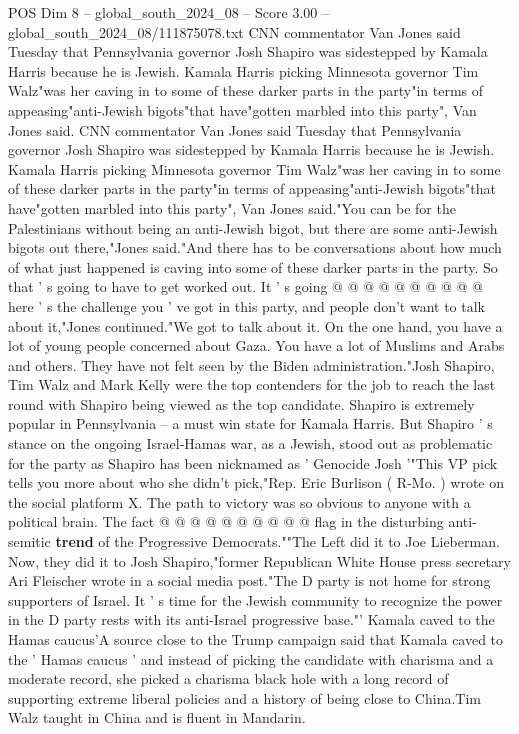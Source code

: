 \begin{textsample}{POS Dim 8 – global\_south\_2024\_08 – Score 3.00 – global\_south\_2024\_08/111875078.txt}  \label{ex:f8_pos_375}
CNN commentator Van Jones said Tuesday that Pennsylvania governor Josh Shapiro was sidestepped by Kamala Harris because he is Jewish.
Kamala Harris picking Minnesota governor Tim Walz"was her caving in to some of these darker parts in the party"in terms of appeasing"anti-Jewish bigots"that have"gotten marbled into this party", Van Jones said.
CNN commentator Van Jones said Tuesday that Pennsylvania governor Josh Shapiro was sidestepped by Kamala Harris because he is Jewish.
Kamala Harris picking Minnesota governor Tim Walz"was her caving in to some of these darker parts in the party"in terms of appeasing"anti-Jewish bigots"that have"gotten marbled into this party", Van Jones said."You can be for the Palestinians without being an anti-Jewish bigot, but there are some anti-Jewish bigots out there,"Jones said."And there has to be conversations about how much of what just happened is caving into some of these darker parts in the party.
So that ' s going to have to get worked out.
It ' s going @ @ @ @ @ @ @ @ @ @ here ' s the challenge you ' ve got in this party, and people don't want to talk about it,"Jones continued."We got to talk about it.
On the one hand, you have a lot of young people concerned about Gaza.
You have a lot of Muslims and Arabs and others.
They have not felt seen by the Biden administration."Josh Shapiro, Tim Walz and Mark Kelly were the top contenders for the job to reach the last round with Shapiro being viewed as the top candidate.
Shapiro is extremely popular in Pennsylvania -- a must win state for Kamala Harris.
But Shapiro ' s stance on the ongoing Israel-Hamas war, as a Jewish, stood out as problematic for the party as Shapiro has been nicknamed as ' Genocide Josh '"This VP pick tells you more about who she didn't pick,"Rep.
Eric Burlison ( R-Mo. ) wrote on the social platform X.
The path to victory was so obvious to anyone with a political brain.
The fact @ @ @ @ @ @ @ @ @ @ flag in the disturbing anti-semitic \textbf{trend} of the Progressive Democrats.""The Left did it to Joe Lieberman.
Now, they did it to Josh Shapiro,"former Republican White House press secretary Ari Fleischer wrote in a social media post."The D party is not home for strong supporters of Israel.
It ' s time for the Jewish community to recognize the power in the D party rests with its anti-Israel progressive base."' Kamala caved to the Hamas caucus'A source close to the Trump campaign said that Kamala caved to the ' Hamas caucus ' and instead of picking the candidate with charisma and a moderate record, she picked a charisma black hole with a long record of supporting extreme liberal policies and a history of being close to China.Tim Walz taught in China and is fluent in Mandarin.

\end{textsample}
